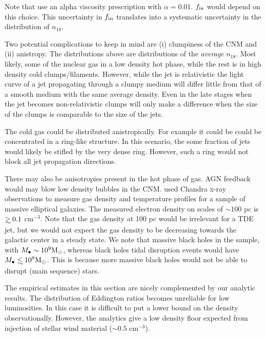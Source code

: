 \documentclass[usenatbib,fleqn]{mnras}
\newcommand\lsim{\mathrel{\rlap{\lower4pt\hbox{\hskip1pt$\sim$}}
    \raise1pt\hbox{$<$}}}
\newcommand\gsim{\mathrel{\rlap{\lower4pt\hbox{\hskip1pt$\sim$}}
    \raise1pt\hbox{$>$}}}
\newcommand{\Mbh}[1][]{M_{\bullet#1}}
\newcommand{\Msun}{{\rm M_\odot}}
\begin{document}
Note that \citet{Li+2013} use an alpha viscosity prescription with
$\alpha=0.01$.  $f_{\rm in}$ would depend on this choice. This
uncertainty in $f_{\rm in}$ translates into a systematic uncertainty
in the distribution of $n_{18}$. 

Two potential complications to keep in mind are (i) clumpiness of the
CNM and (ii) anistropy. The distributions above are distributions of
the {\it average} $n_{18}$.  Most likely, some of the nuclear gas in a
low density hot phase, while the rest is in high density cold
clumps/filaments.  However, while the jet is relativistic the
light curve of a jet propagating through a clumpy medium will differ
little from that of a smooth medium with the same average
density. Even in the late stages when the jet becomes non-relativistic
clumps will only make a difference when the size of the clumps is
comparable to the size of the jets.

The cold gas could be distributed anistropically. For example it could
be could be concentrated in a ring-like structure. In this scenario,
the some fraction of jets would likely be stifled by the very dense
ring. However, such a ring would not block all jet propagation
directions. 

There may also be anisotropies present in the hot phase of gas. AGN
feedback would may blow low density bubbles in the
CNM. \citet{Russell+2013} used Chandra x-ray observations to measure
gas density and temperature profiles for a sample of massive
elliptical galaxies. The measured electron density on scales of $\sim
100$ pc is $\gsim 0.1$ cm$^{-3}$. Note that the gas density at 100 pc
would be irrelevant for a TDE jet, but we would not expect the gas
density to be decreasing towards the galactic center in a steady
state.  We note that massive black holes in the \citet{Russell+2013}
sample, with $\Mbh\sim 10^{9} \Msun$, whereas black holes tidal
disruption events would have $\Mbh\lsim 10^8 \Msun$. This is because
more massive black holes would not be able to disrupt (main sequence)
stars.


The empirical estimates in this section are nicely complemented by our
analytic results. The distribution of Eddington ratios becomes
unreliable for low luminosities.  In this case it is difficult to put
a lower bound on the density observationally. However, the analytics
give a low density floor expected from injection of stellar wind
material ($\sim 0.5$ cm$^{-3}$).

\end{document}
